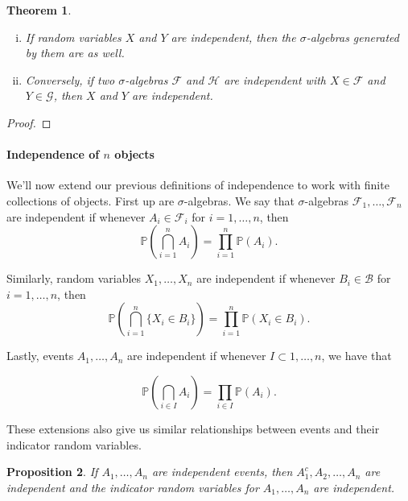 \documentclass[12pt]{article}
\newcommand{\calF}{\mathcal{F}}
\newcommand{\Prob}{\mathbb{P}}
\newtheorem{thm}{Theorem}[section]
\newtheorem{prop}[thm]{Proposition}
\theoremstyle{definition}
\theoremstyle{remark}
\numberwithin{equation}{section}
\begin{document}
\begin{thm}\leavevmode
  \begin{enumerate}[(i)]
    \item If random variables $X$ and $Y$ are independent, then the $\sigma$-algebras generated by them are as well.
    \item Conversely, if two $\sigma$-algebras $\calF$ and $\mathcal{H}$ are independent with $X\in \calF$ and $Y\in\mathcal{G}$, then $X$ and $Y$ are independent.
  \end{enumerate}
\end{thm}
\begin{proof}
\end{proof}

\paragraph{Independence of $n$ objects}%
\label{par:independence_of_n_objects}

We'll now extend our previous definitions of independence to work with finite collections of objects. First up are $\sigma$-algebras. We say that $\sigma$-algebras $\calF_1, \ldots, \calF_n$ are independent if whenever $A_i \in \calF_i$ for $i = 1, \ldots, n$, then 
\begin{equation}
  \Prob\left( \bigcap_{i=1}^{n} A_i \right) = \prod_{i=1}^n \Prob(A_i).
\end{equation}

Similarly, random variables $X_1, \ldots, X_n$ are independent if whenever $B_i\in\mathcal{B}$ for $i=1,\ldots,n$, then 
\begin{equation}
  \Prob\left( \bigcap_{i=1}^{n} \{X_i \in B_i \} \right) = \prod_{i=1}^n \Prob(X_i \in B_i). 
\end{equation}

Lastly, events $A_1, \ldots, A_n$ are independent if whenever $I\subset{1, \ldots, n}$, we have that 

\begin{equation}
  \Prob\left( \bigcap_{i\in I} A_i\right) = \prod_{i\in I} \Prob(A_i). 
\end{equation}

These extensions also give us similar relationships between events and their indicator random variables.
\begin{prop}
If $A_1, \ldots, A_n$ are independent events, then $A_1^c, A_2, \ldots, A_n$ are independent and the indicator random variables for $A_1, \ldots, A_n$ are independent. 
\end{prop}
\end{document}
